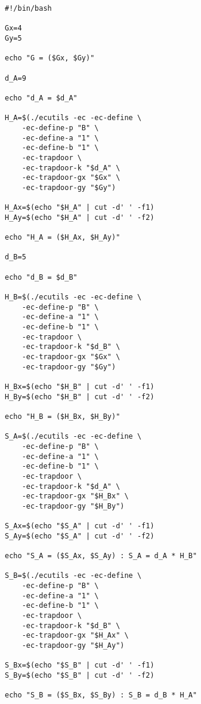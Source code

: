  \label{anexo:f9430204-a55e-4726-a4ca-167391db1ca3}
\begin{verbatim}
#!/bin/bash

Gx=4
Gy=5

echo "G = ($Gx, $Gy)"

d_A=9

echo "d_A = $d_A"

H_A=$(./ecutils -ec -ec-define \
    -ec-define-p "B" \
    -ec-define-a "1" \
    -ec-define-b "1" \
    -ec-trapdoor \
    -ec-trapdoor-k "$d_A" \
    -ec-trapdoor-gx "$Gx" \
    -ec-trapdoor-gy "$Gy")

H_Ax=$(echo "$H_A" | cut -d' ' -f1)
H_Ay=$(echo "$H_A" | cut -d' ' -f2)

echo "H_A = ($H_Ax, $H_Ay)"

d_B=5

echo "d_B = $d_B"
    
H_B=$(./ecutils -ec -ec-define \
    -ec-define-p "B" \
    -ec-define-a "1" \
    -ec-define-b "1" \
    -ec-trapdoor \
    -ec-trapdoor-k "$d_B" \
    -ec-trapdoor-gx "$Gx" \
    -ec-trapdoor-gy "$Gy")

H_Bx=$(echo "$H_B" | cut -d' ' -f1)
H_By=$(echo "$H_B" | cut -d' ' -f2)

echo "H_B = ($H_Bx, $H_By)"

S_A=$(./ecutils -ec -ec-define \
    -ec-define-p "B" \
    -ec-define-a "1" \
    -ec-define-b "1" \
    -ec-trapdoor \
    -ec-trapdoor-k "$d_A" \
    -ec-trapdoor-gx "$H_Bx" \
    -ec-trapdoor-gy "$H_By")

S_Ax=$(echo "$S_A" | cut -d' ' -f1)
S_Ay=$(echo "$S_A" | cut -d' ' -f2)

echo "S_A = ($S_Ax, $S_Ay) : S_A = d_A * H_B"

S_B=$(./ecutils -ec -ec-define \
    -ec-define-p "B" \
    -ec-define-a "1" \
    -ec-define-b "1" \
    -ec-trapdoor \
    -ec-trapdoor-k "$d_B" \
    -ec-trapdoor-gx "$H_Ax" \
    -ec-trapdoor-gy "$H_Ay")

S_Bx=$(echo "$S_B" | cut -d' ' -f1)
S_By=$(echo "$S_B" | cut -d' ' -f2)

echo "S_B = ($S_Bx, $S_By) : S_B = d_B * H_A"

\end{verbatim}

